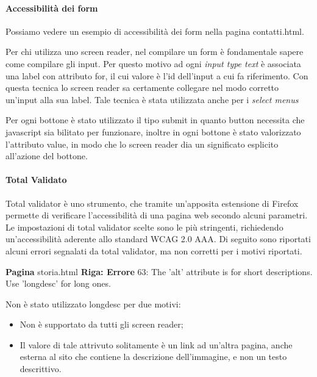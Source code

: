 \paragraph{Accessibilità dei form}

Possiamo vedere un esempio di accessibilità dei form nella pagina contatti.html.

Per chi utilizza uno screen reader, nel compilare un form è fondamentale sapere come compilare gli input. Per questo motivo ad ogni \emph{input type text} è associata una label con attributo for, il cui valore è l'id dell'input a cui fa riferimento. Con questa tecnica lo screen reader sa certamente collegare nel modo corretto un'input alla sua label.
Tale tecnica è stata utilizzata anche per i \emph{select menus}

Per ogni bottone è stato utilizzato il tipo submit in quanto button necessita che javascript sia bilitato per funzionare, inoltre in ogni bottone è stato valorizzato l'attributo value, in modo che lo screen reader dia un significato esplicito all'azione del bottone.

\paragraph{Total Validato}
Total validator è uno strumento, che tramite un'apposita estensione di Firefox permette di verificare l'accessibilità di una pagina web secondo alcuni parametri.
Le impostazioni di total validator scelte sono le più stringenti, richiedendo un'accessibilità aderente allo standard WCAG 2.0 AAA.
Di seguito sono riportati alcuni errori segnalati da total validator, ma non corretti per i motivi riportati.

\textbf{Pagina} storia.html
\textbf{Riga: Errore} 63: The 'alt' attribute is for short descriptions. Use 'longdesc' for long ones.

Non è stato utilizzato longdesc per due motivi:
\begin{itemize}
\item Non è supportato da tutti gli screen reader;
\item Il valore di tale attrivuto solitamente è un link ad un'altra pagina, anche esterna al sito che contiene la descrizione dell'immagine, e non un testo descrittivo.
\end{itemize}

